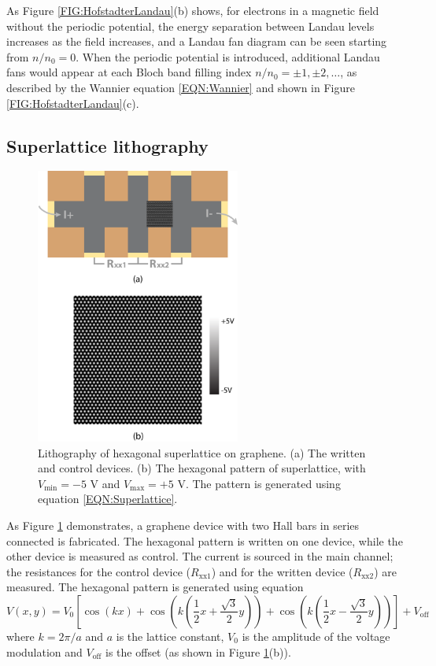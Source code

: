 \documentclass[pdflatex, sectionletters, 12pt]{pittetd}    %
\begin{document}
As Figure \ref{FIG:HofstadterLandau}(b) shows, for electrons in a magnetic field without the periodic potential, the energy separation between Landau levels increases as the field increases, and a Landau fan diagram can be seen starting from $n/n_0 = 0$. When the periodic potential is introduced, additional Landau fans would appear at each Bloch band filling index $n/n_0 = \pm 1, \pm 2, \ldots$, as described by the Wannier equation \ref{EQN:Wannier} and shown in Figure \ref{FIG:HofstadterLandau}(c). 

\subsection{Superlattice lithography}

\begin{figure}[h!]
	\centering
	\includegraphics[width=0.6\textwidth]{Drawing/SuperlatticeWriting.pdf}
	\caption{Lithography of hexagonal superlattice on graphene. (a) The written and control devices. (b) The hexagonal pattern of superlattice, with $V_\mathrm{min} = -5$ V and $V_\mathrm{max} = +5$ V. The pattern is generated using equation \ref{EQN:Superlattice}.}
	\label{FIG:SuperlatticeWriting}
\end{figure}

As Figure \ref{FIG:SuperlatticeWriting} demonstrates, a graphene device with two Hall bars in series connected is fabricated. The hexagonal pattern is written on one device, while the other device is measured as control. The current is sourced in the main channel; the resistances for the control device ($R_\mathrm{xx1}$) and for the written device ($R_\mathrm{xx2}$) are measured. The hexagonal pattern is generated using equation
\begin{equation}
\label{EQN:Superlattice}
V(x, y) = V_0 \left[\cos(kx) + \cos\left( k \left( \frac{1}{2}  x + \frac{\sqrt{3}}{2} y \right) \right) + \cos \left( k \left( \frac{1}{2} x - \frac{\sqrt{3}}{2} y \right) \right) \right] + V_\mathrm{off}
\end{equation}
where $k = 2\pi/a$ and $a$ is the lattice constant, $V_0$ is the amplitude of the voltage modulation and $V_\mathrm{off}$ is the offset (as shown in Figure \ref{FIG:SuperlatticeWriting}(b)). 
\end{document}
